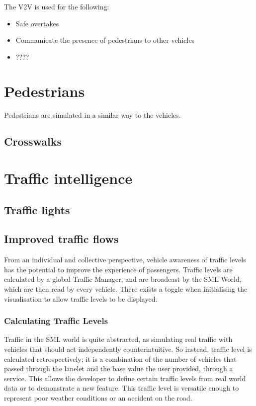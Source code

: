\documentclass[11pt,a4paper]{book}
\begin{document}
\noindent The V2V is used for the following:
\begin{itemize}
\item Safe overtakes
\item Communicate the presence of pedestrians to other vehicles
\item ????
\end{itemize}

\section{Pedestrians}
Pedestrians are simulated in a similar way to the vehicles. 

\subsection{Crosswalks}

\section{Traffic intelligence}
\subsection{Traffic lights}
\subsection{Improved traffic flows}
From an individual and collective perspective, vehicle awareness of traffic levels has the potential to improve the experience of passengers. Traffic levels are calculated by a global Traffic Manager, and are broadcast by the SML World, which are then read by every vehicle. There exists a toggle when initialising the visualisation to allow traffic levels to be displayed.
 
\subsubsection{Calculating Traffic Levels}
Traffic in the SML world is quite abstracted, as simulating real traffic with vehicles that should act independently counterintuitive. So instead, traffic level is calculated retrospectively; it is a combination of the number of vehicles that passed through the lanelet and the base value the user provided, through a service. This allows the developer to define certain traffic levels from real world data or to demonstrate a new feature. This traffic level is versatile enough to represent poor weather conditions or an accident on the road.
 
\end{document}
